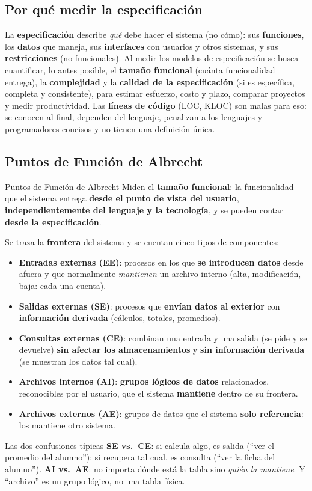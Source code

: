\documentclass[11pt,a4paper]{article}
\begin{document}
\subsection{Por qué medir la especificación}
La \textbf{especificación} describe \emph{qué} debe hacer el sistema (no cómo): sus \textbf{funciones}, los
\textbf{datos} que maneja, sus \textbf{interfaces} con usuarios y otros sistemas, y sus \textbf{restricciones}
(no funcionales). Al medir los modelos de especificación se busca cuantificar, lo antes posible, el
\textbf{tamaño funcional} (cuánta funcionalidad entrega), la \textbf{complejidad} y la \textbf{calidad de la
especificación} (si es específica, completa y consistente), para estimar esfuerzo, costo y plazo, comparar
proyectos y medir productividad. Las \textbf{líneas de código} (LOC, KLOC) son malas para eso: se conocen al
final, dependen del lenguaje, penalizan a los lenguajes y programadores concisos y no tienen una definición única.

\subsection{Puntos de Función de Albrecht}
\label{sec:pf}
\begin{defbox}{Puntos de Función de Albrecht}
Miden el \textbf{tamaño funcional}: la funcionalidad que el sistema entrega \textbf{desde el punto de vista del
usuario}, \textbf{independientemente del lenguaje y la tecnología}, y se pueden contar \textbf{desde la
especificación}.
\end{defbox}
Se traza la \textbf{frontera} del sistema y se cuentan cinco tipos de componentes:
\begin{itemize}
  \item \textbf{Entradas externas (EE)}: procesos en los que \textbf{se introducen datos} desde afuera y que
  normalmente \emph{mantienen} un archivo interno (alta, modificación, baja: cada una cuenta).
  \item \textbf{Salidas externas (SE)}: procesos que \textbf{envían datos al exterior} con \textbf{información
  derivada} (cálculos, totales, promedios).
  \item \textbf{Consultas externas (CE)}: combinan una entrada y una salida (se pide y se devuelve)
  \textbf{sin afectar los almacenamientos} y \textbf{sin información derivada} (se muestran los datos tal cual).
  \item \textbf{Archivos internos (AI)}: \textbf{grupos lógicos de datos} relacionados, reconocibles por el
  usuario, que el sistema \textbf{mantiene} dentro de su frontera.
  \item \textbf{Archivos externos (AE)}: grupos de datos que el sistema \textbf{solo referencia}: los mantiene
  otro sistema.
\end{itemize}
\begin{aviso}{Las dos confusiones típicas}
\textbf{SE vs.\ CE}: si calcula algo, es salida (``ver el promedio del alumno''); si recupera tal cual, es
consulta (``ver la ficha del alumno''). \textbf{AI vs.\ AE}: no importa dónde está la tabla sino \emph{quién la
mantiene}. Y ``archivo'' es un grupo lógico, no una tabla física.
\end{aviso}
\end{document}
